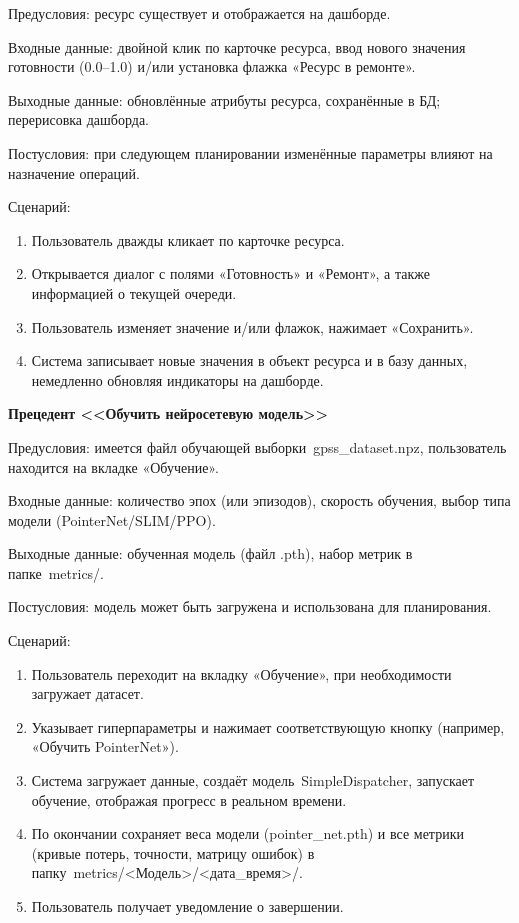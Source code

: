 Предусловия: ресурс существует и отображается на дашборде.

Входные данные: двойной клик по карточке ресурса, ввод нового значения готовности (0.0–1.0) и/или установка флажка «Ресурс в ремонте».

Выходные данные: обновлённые атрибуты ресурса, сохранённые в БД; перерисовка дашборда.

Постусловия: при следующем планировании изменённые параметры влияют на назначение операций.

Сценарий:

\begin{enumerate}
\item Пользователь дважды кликает по карточке ресурса.
\item Открывается диалог с полями «Готовность» и «Ремонт», а также информацией о текущей очереди.
\item Пользователь изменяет значение и/или флажок, нажимает «Сохранить».
\item Система записывает новые значения в объект ресурса и в базу данных, немедленно обновляя индикаторы на дашборде.
\end{enumerate}

\textbf{Прецедент <<Обучить нейросетевую модель>>}

Предусловия: имеется файл обучающей выборки gpss\_dataset.npz, пользователь находится на вкладке «Обучение».

Входные данные: количество эпох (или эпизодов), скорость обучения, выбор типа модели (PointerNet/SLIM/PPO).

Выходные данные: обученная модель (файл .pth), набор метрик в папке metrics/.

Постусловия: модель может быть загружена и использована для планирования.

Сценарий:

\begin{enumerate}
\item Пользователь переходит на вкладку «Обучение», при необходимости загружает датасет.
\item Указывает гиперпараметры и нажимает соответствующую кнопку (например, «Обучить PointerNet»).
\item Система загружает данные, создаёт модель SimpleDispatcher, запускает обучение, отображая прогресс в реальном времени.
\item По окончании сохраняет веса модели (pointer\_net.pth) и все метрики (кривые потерь, точности, матрицу ошибок) в папку metrics/<Модель>/<дата\_время>/.
\item Пользователь получает уведомление о завершении.
\end{enumerate}

